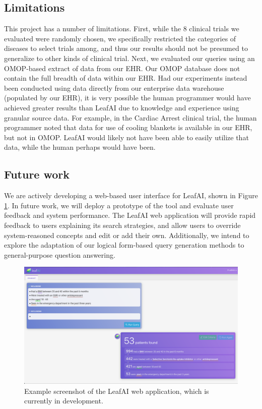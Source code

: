 \documentclass[../main.tex]{subfiles}
\begin{document}
\subsection*{Limitations}

This project has a number of limitations. First, while the 8 clinical trials we evaluated were randomly chosen, we specifically restricted the categories of diseases to select trials among, and thus our results should not be presumed to generalize to other kinds of clinical trial. Next, we evaluated our queries using an OMOP-based extract of data from our EHR. Our OMOP database does not contain the full breadth of data within our EHR. Had our experiments instead been conducted using data directly from our enterprise data warehouse (populated by our EHR), it is very possible the human programmer would have achieved greater results than LeafAI due to knowledge and experience using granular source data. For example, in the Cardiac Arrest clinical trial, the human programmer noted that data for use of cooling blankets is available in our EHR, but not in OMOP. LeafAI would likely not have been able to easily utilize that data, while the human perhaps would have been. 

\subsection*{Future work}

We are actively developing a web-based user interface for LeafAI, shown in Figure \ref{fig_leafai_screenshot}. In future work, we will deploy a prototype of the tool and evaluate user feedback and system performance. The LeafAI web application will provide rapid feedback to users explaining its search strategies, and allow users to override system-reasoned concepts and edit or add their own. Additionally, we intend to explore the adaptation of our logical form-based query generation methods to general-purpose question answering.

\begin{figure}[H]
  \includegraphics[scale=0.26]{figures/leafai_screenshot.png}  
\caption{Example screenshot of the LeafAI web application, which is currently in development.}
\label{fig_leafai_screenshot}
\end{figure}
\end{document}
